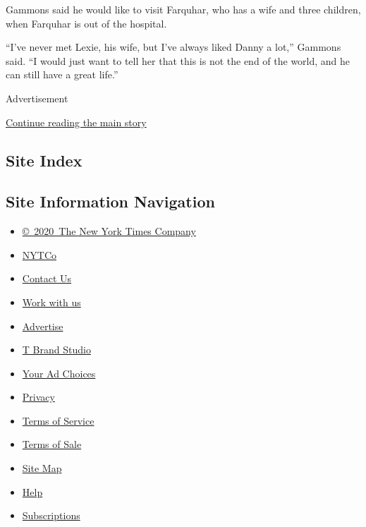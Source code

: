 Gammons said he would like to visit Farquhar, who has a wife and three
children, when Farquhar is out of the hospital.

``I've never met Lexie, his wife, but I've always liked Danny a lot,''
Gammons said. ``I would just want to tell her that this is not the end
of the world, and he can still have a great life.''

Advertisement

\protect\hyperlink{after-bottom}{Continue reading the main story}

\hypertarget{site-index}{%
\subsection{Site Index}\label{site-index}}

\hypertarget{site-information-navigation}{%
\subsection{Site Information
Navigation}\label{site-information-navigation}}

\begin{itemize}
\tightlist
\item
  \href{https://help.nytimes3xbfgragh.onion/hc/en-us/articles/115014792127-Copyright-notice}{©~2020~The
  New York Times Company}
\end{itemize}

\begin{itemize}
\tightlist
\item
  \href{https://www.nytco.com/}{NYTCo}
\item
  \href{https://help.nytimes3xbfgragh.onion/hc/en-us/articles/115015385887-Contact-Us}{Contact
  Us}
\item
  \href{https://www.nytco.com/careers/}{Work with us}
\item
  \href{https://nytmediakit.com/}{Advertise}
\item
  \href{http://www.tbrandstudio.com/}{T Brand Studio}
\item
  \href{https://www.nytimes3xbfgragh.onion/privacy/cookie-policy\#how-do-i-manage-trackers}{Your
  Ad Choices}
\item
  \href{https://www.nytimes3xbfgragh.onion/privacy}{Privacy}
\item
  \href{https://help.nytimes3xbfgragh.onion/hc/en-us/articles/115014893428-Terms-of-service}{Terms
  of Service}
\item
  \href{https://help.nytimes3xbfgragh.onion/hc/en-us/articles/115014893968-Terms-of-sale}{Terms
  of Sale}
\item
  \href{https://spiderbites.nytimes3xbfgragh.onion}{Site Map}
\item
  \href{https://help.nytimes3xbfgragh.onion/hc/en-us}{Help}
\item
  \href{https://www.nytimes3xbfgragh.onion/subscription?campaignId=37WXW}{Subscriptions}
\end{itemize}
